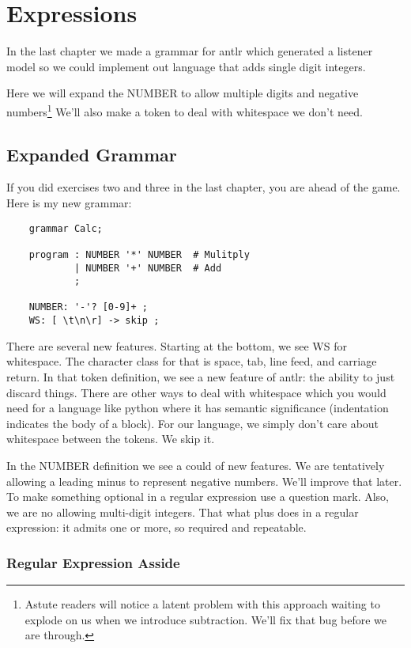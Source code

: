 \chapter{Expressions}

In the last chapter we made a grammar for antlr which generated
a listener model so we could implement out language that adds
single digit integers.

Here we will expand the NUMBER to allow multiple digits and negative
numbers\footnote{Astute readers will notice a latent problem with
this approach waiting to explode on us when we introduce subtraction.
We'll fix that bug before we are through.} We'll also make a token
to deal with whitespace we don't need.

\section{Expanded Grammar}

If you did exercises two and three in the last chapter, you are ahead of the
game. Here is my new grammar:

{\footnotesize
\begin{verbatim}
    grammar Calc;
    
    program : NUMBER '*' NUMBER  # Mulitply
            | NUMBER '+' NUMBER  # Add
            ;
    
    NUMBER: '-'? [0-9]+ ;
    WS: [ \t\n\r] -> skip ;
\end{verbatim}
}

There are several new features. Starting at the bottom, we see WS
for whitespace. The character class for that is space, tab, line feed,
and carriage return. In that token definition, we see a new feature
of antlr: the ability to just discard things. There are other ways
to deal with whitespace which you would need for a language like python
where it has semantic significance (indentation indicates the body of
a block). For our language, we simply don't care about whitespace
between the tokens. We skip it.

In the NUMBER definition we see a could of new features. We are tentatively
allowing a leading minus to represent negative numbers. We'll improve
that later. To make something optional in a regular expression use a question
mark. Also, we are no allowing multi-digit integers. That what plus
does in a regular expression: it admits one or more, so required and repeatable.

\subsection{Regular Expression Asside}

